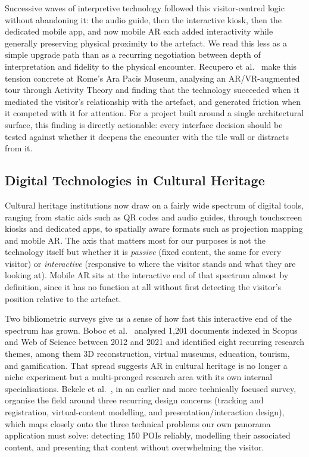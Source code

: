 Successive waves of interpretive technology followed this visitor-centred
logic without abandoning it: the audio guide, then the interactive kiosk,
then the dedicated mobile app, and now mobile AR each added interactivity
while generally preserving physical proximity to the artefact. We read
this less as a simple upgrade path than as a recurring negotiation
between depth of interpretation and fidelity to the physical encounter. Recupero
et al.\ \cite{recupero2019} make this tension concrete at Rome's Ara
Pacis Museum, analysing an AR/VR-augmented tour through Activity Theory
and finding that the technology succeeded when it mediated the visitor's
relationship with the artefact, and generated friction when it competed
with it for attention. For a project built around a single architectural
surface, this finding is directly actionable: every interface decision
should be tested against whether it deepens the encounter with the tile
wall or distracts from it.

\subsection{Digital Technologies in Cultural Heritage}
\label{subsec:rw-ch-tech}

Cultural heritage institutions now draw on a fairly wide spectrum of
digital tools, ranging from static aids such as QR codes and audio guides,
through touchscreen kiosks and dedicated apps, to spatially aware formats
such as projection mapping and mobile AR. The axis that matters most for
our purposes is not the technology itself but whether it is
\emph{passive} (fixed content, the same for every visitor) or
\emph{interactive} (responsive to where the visitor stands and what they
are looking at). Mobile AR sits at the interactive end of that spectrum
almost by definition, since it has no function at all without first
detecting the visitor's position relative to the artefact.

Two bibliometric surveys give us a sense of how fast this interactive end
of the spectrum has grown. Boboc et al.\ \cite{boboc2022} analysed 1,201
documents indexed in Scopus and Web of Science between 2012 and 2021 and
identified eight recurring research themes, among them 3D reconstruction,
virtual museums, education, tourism, and gamification. That spread
suggests AR in cultural heritage is no longer a niche experiment but a
multi-pronged research area with its own internal specialisations.
Bekele et al.\ \cite{bekele2018}, in an earlier and more technically
focused survey, organise the field around three recurring design
concerns (tracking and registration, virtual-content modelling, and presentation/interaction design), which maps closely onto the three
technical problems our own panorama application must solve: detecting
150 POIs reliably, modelling their associated content, and presenting that
content without overwhelming the visitor.

